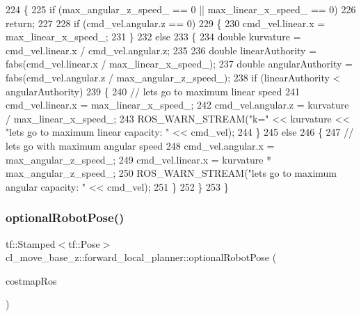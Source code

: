 \begin{DoxyCode}
224 \{
225     \textcolor{keywordflow}{if} (max\_angular\_z\_speed\_ == 0 || max\_linear\_x\_speed\_ == 0)
226         \textcolor{keywordflow}{return};
227 
228     \textcolor{keywordflow}{if} (cmd\_vel.angular.z == 0)
229     \{
230         cmd\_vel.linear.x = max\_linear\_x\_speed\_;
231     \}
232     \textcolor{keywordflow}{else}
233     \{
234         \textcolor{keywordtype}{double} kurvature = cmd\_vel.linear.x / cmd\_vel.angular.z;
235 
236         \textcolor{keywordtype}{double} linearAuthority = fabs(cmd\_vel.linear.x / max\_linear\_x\_speed\_);
237         \textcolor{keywordtype}{double} angularAuthority = fabs(cmd\_vel.angular.z / max\_angular\_z\_speed\_);
238         \textcolor{keywordflow}{if} (linearAuthority < angularAuthority)
239         \{
240             \textcolor{comment}{// lets go to maximum linear speed}
241             cmd\_vel.linear.x = max\_linear\_x\_speed\_;
242             cmd\_vel.angular.z = kurvature / max\_linear\_x\_speed\_;
243             ROS\_WARN\_STREAM(\textcolor{stringliteral}{"k="} << kurvature << \textcolor{stringliteral}{"lets go to maximum linear capacity: "} << cmd\_vel);
244         \}
245         \textcolor{keywordflow}{else}
246         \{
247             \textcolor{comment}{// lets go with maximum angular speed}
248             cmd\_vel.angular.x = max\_angular\_z\_speed\_;
249             cmd\_vel.linear.x = kurvature * max\_angular\_z\_speed\_;
250             ROS\_WARN\_STREAM(\textcolor{stringliteral}{"lets go to maximum angular capacity: "} << cmd\_vel);
251         \}
252     \}
253 \}
\end{DoxyCode}
\mbox{\label{namespacecl__move__base__z_1_1forward__local__planner_a4c20f9fe0ca67779c53e90182baf4997}} 
\subsubsection{\texorpdfstring{optional\+Robot\+Pose()}{optionalRobotPose()}}
{\footnotesize\ttfamily tf\+::\+Stamped$<$tf\+::\+Pose$>$ cl\+\_\+move\+\_\+base\+\_\+z\+::forward\+\_\+local\+\_\+planner\+::optional\+Robot\+Pose (\begin{DoxyParamCaption}\item[{costmap\+\_\+2d\+::\+Costmap2\+D\+R\+OS $\ast$}]{costmap\+Ros }\end{DoxyParamCaption})}



